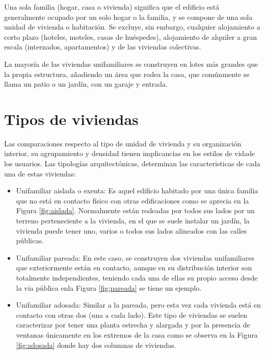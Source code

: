\documentclass[11pt,letterpaper]{report}
\begin{document}
	Una sola familia (hogar, casa o vivienda) significa que el edificio está generalmente ocupado por un solo hogar o la familia, y se compone de una sola unidad de vivienda o habitación. Se excluye, sin embargo, cualquier alojamiento a corto plazo (hoteles, moteles, casas de huéspedes), alojamiento de alquiler a gran escala (internados, apartamentos) y de las viviendas colectivas.
	
La mayoría de las viviendas unifamiliares se construyen en lotes más grandes que la propia estructura, añadiendo un área que rodea la casa, que comúnmente se llama un patio o un jardín, con un garaje y entrada. 
	\section{Tipos de viviendas}
	Las comparaciones respecto al tipo de unidad de vivienda y su organización interior, su agrupamiento y
densidad tienen implicancias en los estilos de vidade los usuarios. Las tipologías
arquitectónicas, determinan las caracteristicas de cada una de estas viviendas:
		\begin{itemize}
		\item Unifamiliar aislada o exenta: Es aquel edificio habitado por una única familia que no está en contacto físico con otras edificaciones como se aprecia en la Figura \ref{fig:aislada}. Normalmente están rodeadas por todos sus lados por un terreno perteneciente a la vivienda, en el que se suele instalar un jardín, la vivienda puede tener uno, varios o todos sus lados alineados con las calles públicas.
		\item Unifamiliar pareada: En este caso, se construyen dos viviendas unifamiliares que exteriormente están en contacto, aunque en su distribución interior son totalmente independientes, teniendo cada una de ellas su propio acceso desde la vía pública enla Figura \ref{fig:pareada}  se tiene un ejemplo.
		\item Unifamiliar adosada: Similar a la pareada, pero esta vez cada vivienda está en contacto con otras dos (una a cada lado). Este tipo de viviendas se suelen caracterizar por tener una planta estrecha y alargada y por la presencia de ventanas únicamente en los extremos de la casa como se observa en la Figura \ref{fig:adosada} donde hay dos columnas de viviendas.
		\end{itemize}
\end{document}
